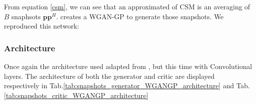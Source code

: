 \documentclass{article}
\begin{document}
From equation \ref{csm}, we can see that an approximated of CSM is an averaging of $B$ snaphsots $\mathbf{p} \mathbf{p}^H$. \cite{gerstoft2020parametric} creates a WGAN-GP to generate those snapshots. We reproduced this network:

\subsubsection{Architecture}

Once again the architecture used adapted from \cite{nain2020wgangp}, but this time with Convolutional layers. The architecture of both the generator and critic are displayed respectively in Tab.\ref{tab:snapshots_generator_WGANGP_architecture} and Tab.\ref{tab:snapshots_critic_WGANGP_architecture}
\end{document}
